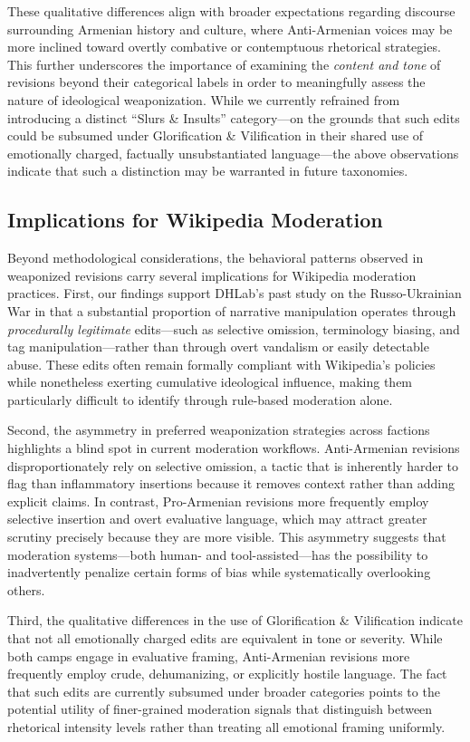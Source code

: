 \documentclass[11pt, a4paper, twoside, openright]{article} %
\begin{document}
These qualitative differences align with broader expectations regarding discourse surrounding Armenian history and culture, where Anti-Armenian voices may be more inclined toward overtly combative or contemptuous rhetorical strategies. This further underscores the importance of examining the \emph{content and tone} of revisions beyond their categorical labels in order to meaningfully assess the nature of ideological weaponization. While we currently refrained from introducing a distinct ``Slurs \& Insults'' category—on the grounds that such edits could be subsumed under Glorification \& Vilification in their shared use of emotionally charged, factually unsubstantiated language—the above observations indicate that such a distinction may be warranted in future taxonomies.

\subsection{Implications for Wikipedia Moderation}

Beyond methodological considerations, the behavioral patterns observed in weaponized revisions carry several implications for Wikipedia moderation practices. First, our findings support DHLab's past study on the Russo-Ukrainian War in that a substantial proportion of narrative manipulation operates through \emph{procedurally legitimate} edits—such as selective omission, terminology biasing, and tag manipulation—rather than through overt vandalism or easily detectable abuse. These edits often remain formally compliant with Wikipedia’s policies while nonetheless exerting cumulative ideological influence, making them particularly difficult to identify through rule-based moderation alone.

Second, the asymmetry in preferred weaponization strategies across factions highlights a blind spot in current moderation workflows. Anti-Armenian revisions disproportionately rely on selective omission, a tactic that is inherently harder to flag than inflammatory insertions because it removes context rather than adding explicit claims. In contrast, Pro-Armenian revisions more frequently employ selective insertion and overt evaluative language, which may attract greater scrutiny precisely because they are more visible. This asymmetry suggests that moderation systems—both human- and tool-assisted—has the possibility to inadvertently penalize certain forms of bias while systematically overlooking others.

Third, the qualitative differences in the use of Glorification \& Vilification indicate that not all emotionally charged edits are equivalent in tone or severity. While both camps engage in evaluative framing, Anti-Armenian revisions more frequently employ crude, dehumanizing, or explicitly hostile language. The fact that such edits are currently subsumed under broader categories points to the potential utility of finer-grained moderation signals that distinguish between rhetorical intensity levels rather than treating all emotional framing uniformly.
\end{document}
